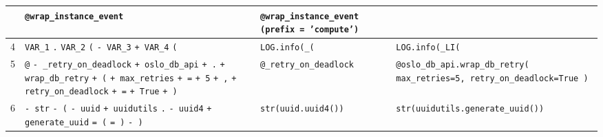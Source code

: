 \documentclass[11pt]{jreport}
\begin{document}
\begin{table}[t]
\begin{tabular}{r|p{6cm}|p{5cm}|p{5cm}}
        &
        \texttt{@wrap\_instance\_event}
        &
        \texttt{@wrap\_instance\_event\newline
        (prefix = 'compute')}\\
        \hline
        4 &
        \colorbox{lightgray!50}{\texttt{VAR\_1}} \colorbox{lightgray!50}{\texttt{.}} \colorbox{lightgray!50}{\texttt{VAR\_2}} \colorbox{lightgray!50}{\texttt{(}}
        \colorbox{lightgray!50}{\texttt{- VAR\_3}} \colorbox{lightgray!50}{\texttt{+ VAR\_4}}
        \colorbox{lightgray!50}{\texttt{(}}
        &
        \texttt{LOG.info(\_(}
        &
        \texttt{LOG.info(\_LI(}\\
        \hline
        5 &
        \colorbox{lightgray!50}{\texttt{@}} \colorbox{lightgray!50}{\texttt{- \_retry\_on\_deadlock}} \colorbox{lightgray!50}{\texttt{+ oslo\_db\_api}}
        \newline
        \colorbox{lightgray!50}{\texttt{+ .}} \colorbox{lightgray!50}{\texttt{+ wrap\_db\_retry}} \colorbox{lightgray!50}{\texttt{+ (}}
        \newline
        \colorbox{lightgray!50}{\texttt{+ max\_retries}} \colorbox{lightgray!50}{\texttt{+ =}} \colorbox{lightgray!50}{\texttt{+ 5}} \colorbox{lightgray!50}{\texttt{+ ,}} 
        \newline
        \colorbox{lightgray!50}{\texttt{+ retry\_on\_deadlock}} \colorbox{lightgray!50}{\texttt{+ =}} \colorbox{lightgray!50}{\texttt{+ True}} \colorbox{lightgray!50}{\texttt{+ )}}
        &
        \texttt{@\_retry\_on\_deadlock}
        &
        \texttt{@oslo\_db\_api.wrap\_db\_retry(
        \newline
        max\_retries=5, retry\_on\_deadlock=True
        \newline
        )}\\
        \hline
        6 &
        \colorbox{lightgray!50}{\texttt{- str}} \colorbox{lightgray!50}{\texttt{- (}} \colorbox{lightgray!50}{\texttt{- uuid}} \colorbox{lightgray!50}{\texttt{+ uuidutils}} \colorbox{lightgray!50}{\texttt{.}} \colorbox{lightgray!50}{\texttt{- uuid4}} \colorbox{lightgray!50}{\texttt{+ generate\_uuid}} \colorbox{lightgray!50}{\texttt{= (}} 
        \colorbox{lightgray!50}{\texttt{= )}} \colorbox{lightgray!50}{\texttt{- )}}
        &
        \texttt{str(uuid.uuid4())}
        &
        \texttt{str(uuidutils.generate\_uuid())}\\
        \hline
    \end{tabular}
\end{table}
\end{document}
